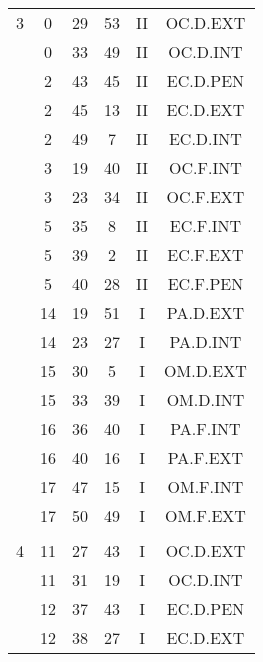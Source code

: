 \documentclass[12pt, a4paper]{article}
\begin{document}
\begin{multicols}{3}
{\begin{tabular}{c c c c c c}
	 	 	 	3 & 0 & 29 & 53 & II & OC.D.EXT\\%
	 	 	 	 & 0 & 33 & 49 & II & OC.D.INT\\%
	 	 	 	 & 2 & 43 & 45 & II & EC.D.PEN\\%
	 	 	 	 & 2 & 45 & 13 & II & EC.D.EXT\\%
	 	 	 	 & 2 & 49 & 7 & II & EC.D.INT\\%
	 	 	 	 & 3 & 19 & 40 & II & OC.F.INT\\%
	 	 	 	 & 3 & 23 & 34 & II & OC.F.EXT\\%
	 	 	 	 & 5 & 35 & 8 & II & EC.F.INT\\%
	 	 	 	 & 5 & 39 & 2 & II & EC.F.EXT\\%
	 	 	 	 & 5 & 40 & 28 & II & EC.F.PEN\\%
	 	 	 	 & 14 & 19 & 51 & I & PA.D.EXT\\%
	 	 	 	 & 14 & 23 & 27 & I & PA.D.INT\\%
	 	 	 	 & 15 & 30 & 5 & I & OM.D.EXT\\%
	 	 	 	 & 15 & 33 & 39 & I & OM.D.INT\\%
	 	 	 	 & 16 & 36 & 40 & I & PA.F.INT\\%
	 	 	 	 & 16 & 40 & 16 & I & PA.F.EXT\\%
	 	 	 	 & 17 & 47 & 15 & I & OM.F.INT\\%
	 	 	 	 & 17 & 50 & 49 & I & OM.F.EXT\\%
	 	 	 	 & & & & & \\%
	 	 	 	4 & 11 & 27 & 43 & I & OC.D.EXT\\%
	 	 	 	 & 11 & 31 & 19 & I & OC.D.INT\\%
	 	 	 	 & 12 & 37 & 43 & I & EC.D.PEN\\%
	 	 	 	 & 12 & 38 & 27 & I & EC.D.EXT\\%

\end{tabular}}
\end{multicols}
\end{document}
